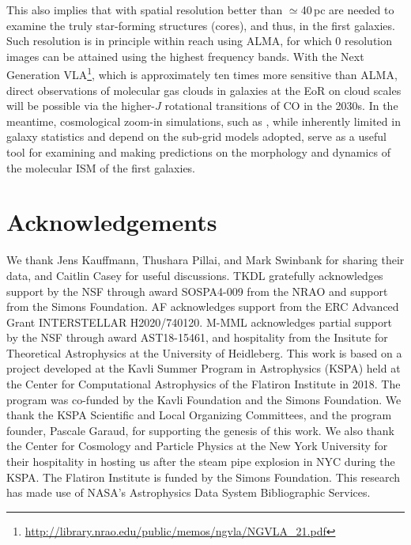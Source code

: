 \IfFileExists{emulateapjlegacy.cls}{\documentclass[iop]{emulateapjlegacy}}{\documentclass[iop]{emulateapj}}
\begin{document}
This also implies that \obs with spatial resolution better than $\simeq$40\,pc are needed to examine the truly star-forming structures (cores), and thus, \SF in the first galaxies. Such resolution is in principle within reach using ALMA, for which 0 resolution images can be attained using the highest frequency bands. With the Next Generation VLA\footnote{\url{http://library.nrao.edu/public/memos/ngvla/NGVLA\_21.pdf}}, which is approximately ten times more sensitive than ALMA, direct observations of molecular gas clouds in galaxies at the EoR on cloud scales will be possible via the higher-$J$ rotational transitions of CO in the 2030s.
In the meantime, cosmological zoom-in simulations, such as , while inherently limited in galaxy statistics and depend on
the sub-grid models adopted, serve as a useful tool for examining and making predictions on the morphology and dynamics of the molecular ISM of the first galaxies.


\section*{Acknowledgements}
We thank Jens Kauffmann, Thushara Pillai, and Mark Swinbank for sharing their data, and Caitlin Casey for useful discussions.
%
TKDL gratefully acknowledges support by the NSF through award SOSPA4-009 from the NRAO and support from the Simons Foundation.
%
AF acknowledges support from the ERC Advanced Grant INTERSTELLAR
H2020/740120.
M-MML acknowledges partial support by the NSF through award
AST18-15461, and hospitality from the Insitute for Theoretical
Astrophysics at the University of Heidleberg.
%
This work is based on a project developed at the Kavli Summer Program in Astrophysics (KSPA) held at the Center for Computational Astrophysics of the Flatiron Institute in 2018. The program was co-funded by the Kavli Foundation and the Simons Foundation.
%
We thank the KSPA Scientific and Local Organizing Committees, and the program founder, Pascale Garaud, for supporting the genesis of this work.
%
We also thank the Center for Cosmology and Particle Physics at the New York University for their hospitality in hosting us after the steam pipe explosion in NYC during the KSPA.
%
The Flatiron Institute is funded by the Simons Foundation.
This research has made use of NASA's Astrophysics Data System Bibliographic Services.
%



\end{document}
